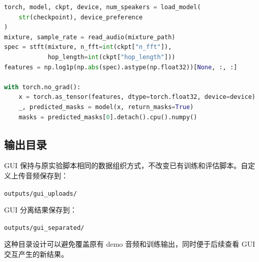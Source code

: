 \begin{lstlisting}[language=Python, caption={GUI 自定义音频分离流程}, label={code:gui_separate}]
torch, model, ckpt, device, num_speakers = load_model(
    str(checkpoint), device_preference
)
mixture, sample_rate = read_audio(mixture_path)
spec = stft(mixture, n_fft=int(ckpt["n_fft"]),
            hop_length=int(ckpt["hop_length"]))
features = np.log1p(np.abs(spec).astype(np.float32))[None, :, :]

with torch.no_grad():
    x = torch.as_tensor(features, dtype=torch.float32, device=device)
    _, predicted_masks = model(x, return_masks=True)
    masks = predicted_masks[0].detach().cpu().numpy()
\end{lstlisting}

\subsection{输出目录}

GUI 保持与原实验脚本相同的数据组织方式，不改变已有训练和评估脚本。自定义上传音频保存到：

\begin{center}
\texttt{outputs/gui\_uploads/}
\end{center}

GUI 分离结果保存到：

\begin{center}
\texttt{outputs/gui\_separated/}
\end{center}

这种目录设计可以避免覆盖原有 demo 音频和训练输出，同时便于后续查看 GUI 交互产生的新结果。
